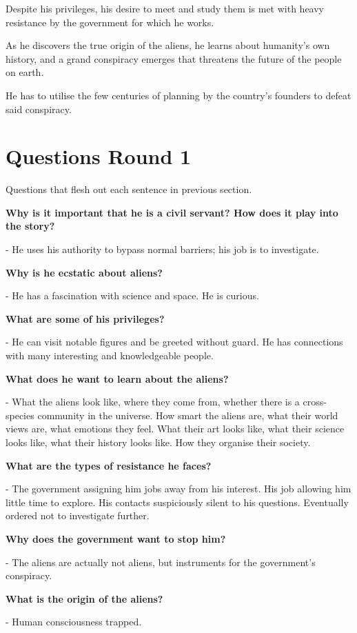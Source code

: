 \documentclass[11pt]{article}
\begin{document}
Despite his privileges, his desire to meet and study them is met with heavy resistance by the government for which he works. 

As he discovers the true origin of the aliens, he learns about humanity's own history, and a grand conspiracy emerges that threatens the future of the people on earth. 

He has to utilise the few centuries of planning by the country's founders to defeat said conspiracy.

\section{Questions Round 1}
Questions that flesh out each sentence in previous section.

\textbf{Why is it important that he is a civil servant? How does it play into the story?}

- He uses his authority to bypass normal barriers; his job is to investigate. 


\textbf{Why is he ecstatic about aliens?}

- He has a fascination with science and space. He is curious.


\textbf{What are some of his privileges?}

- He can visit notable figures and be greeted without guard. 
He has connections with many interesting and knowledgeable people.


\textbf{What does he want to learn about the aliens?}

- What the aliens look like, where they come from, whether there is a cross-species community in the universe. 
How smart the aliens are, what their world views are, what emotions they feel.
What their art looks like, what their science looks like, what their history looks like.
How they organise their society.


\textbf{What are the types of resistance he faces? }

- The government assigning him jobs away from his interest.
His job allowing him little time to explore.
His contacts suspiciously silent to his questions.
Eventually ordered not to investigate further.


\textbf{Why does the government want to stop him?}

- The aliens are actually not aliens, but instruments for the government's conspiracy.


\textbf{What is the origin of the aliens?}

- Human consciousness trapped.
\end{document}
